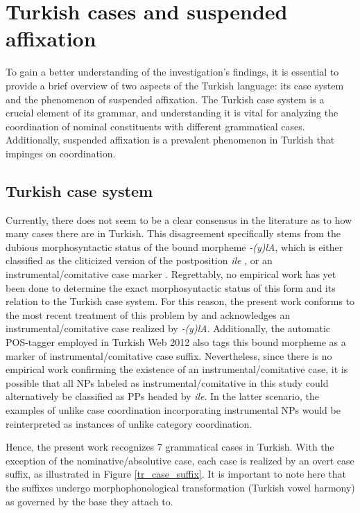 \section{Turkish cases and suspended affixation} \label{sec:turkishcasesandsa}

To gain a better understanding of the investigation's findings, it is essential to provide a brief overview of two aspects of the Turkish language: its case system and the phenomenon of suspended affixation. The Turkish case system is a crucial element of its grammar, and understanding it is vital for analyzing the coordination of nominal constituents with different grammatical cases. Additionally, suspended affixation is a prevalent phenomenon in Turkish that impinges on coordination.

\subsection{Turkish case system} \label{sec:turkishcasesys}

Currently, there does not seem to be a clear consensus in the literature as to how many cases there are in Turkish. This disagreement specifically stems from the dubious morphosyntactic status of the bound morpheme \textit{-(y)lA}, which is either classified as the cliticized version of the postposition \textit{ile} \citep{lewis1967, kornfilt97}, or an instrumental/comitative case marker \citep[p.\ 54]{asli_kerslake_2010}. Regrettably, no empirical work has yet been done to determine the exact morphosyntactic status of this form and its relation to the Turkish case system. For this reason, the present work conforms to the most recent treatment of this problem by \citet{asli_kerslake_2010} and acknowledges an instrumental/comitative case realized by \textit{-(y)lA}. Additionally, the automatic POS-tagger employed in Turkish Web 2012 \citep{tekintrmorph} also tags this bound morpheme as a marker of instrumental/comitative case suffix. Nevertheless, since there is no empirical work confirming the existence of an instrumental/comitative case, it is possible that all NPs labeled as instrumental/comitative in this study could alternatively be classified as PPs headed by \textit{ile}. In the latter scenario, the examples of unlike case coordination incorporating instrumental NPs would be reinterpreted as instances of unlike category coordination.

Hence, the present work recognizes 7 grammatical cases in Turkish. With the exception of the nominative/absolutive case, each case is realized by an overt case suffix, as illustrated in Figure \ref{tr_case_suffix}. It is important to note here that the suffixes undergo morphophonological transformation (Turkish vowel harmony) as governed by the base they attach to.

